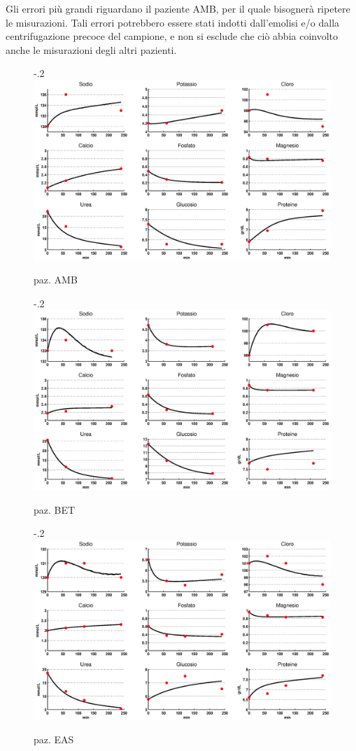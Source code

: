 Gli errori più grandi riguardano il paziente AMB, per il quale bisognerà ripetere le misurazioni. Tali errori potrebbero essere stati indotti dall'emolisi e/o dalla centrifugazione precoce del campione, e non si esclude che ciò abbia coinvolto anche le misurazioni degli altri pazienti.

\begin{figure}[htb]
	\centering
	\advance\leftskip-.2\textwidth
		\includegraphics[width=1.4\textwidth]{immagini/ambcal.eps}
		\caption{paz. AMB}\label{fig:ambcal}		
\end{figure}
\begin{figure}[htb]
	\centering
	\advance\leftskip-.2\textwidth
		\includegraphics[width=1.4\textwidth]{immagini/betcal.eps}
		\caption{paz. BET}		
\end{figure}
\begin{figure}[htb]
	\centering
	\advance\leftskip-.2\textwidth
		\includegraphics[width=1.4\textwidth]{immagini/eascal.eps}
		\caption{paz. EAS}		
\end{figure}
